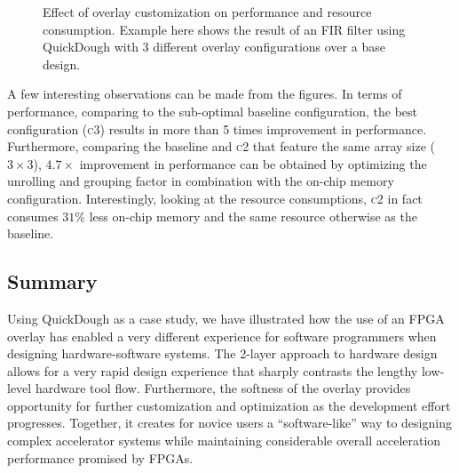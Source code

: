 \begin{figure}
\centering
{}
\hfill
{}
\newline
{}
\caption{Effect of overlay customization on performance and resource consumption.  Example here shows the result of an FIR filter using QuickDough with 3 different overlay configurations over a base design.}
\label{fig:qd_customization_fir}
\end{figure}

A few interesting observations can be made from the figures.  In terms of performance, comparing to the sub-optimal baseline configuration, the best configuration (\textsc{c3}) results in more than 5 times improvement in performance.
Furthermore, comparing the baseline and \textsc{c2} that feature the same array size ($3\times 3$), $4.7\times$ improvement in performance can be obtained by optimizing the unrolling and grouping factor in combination with the on-chip memory configuration.
Interestingly, looking at the resource consumptions, \textsc{c2} in fact consumes $31\%$ less on-chip memory and the same resource otherwise as the baseline.

\subsection{Summary}
Using QuickDough as a case study, we have illustrated how the use of an FPGA overlay has enabled a very different experience for software programmers when designing hardware-software systems.
The 2-layer approach to hardware design allows for a very rapid design experience that sharply contrasts the lengthy low-level hardware tool flow.
Furthermore, the softness of the overlay provides opportunity for further customization and optimization as the development effort progresses.
Together, it creates for novice users a ``software-like'' way to designing complex accelerator systems while maintaining considerable overall acceleration performance promised by FPGAs.



